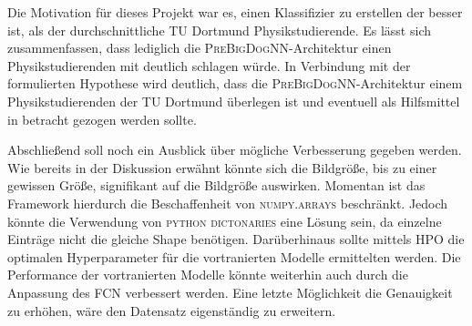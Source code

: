 Die Motivation für dieses Projekt war es, einen Klassifizier zu erstellen
der besser ist, als der durchschnittliche TU Dortmund Physikstudierende.
Es lässt sich zusammenfassen, dass lediglich die \textsc{PreBigDogNN}-Architektur
einen Physikstudierenden mit deutlich schlagen würde. In Verbindung mit
der formulierten Hypothese wird deutlich, dass die \textsc{PreBigDogNN}-Architektur
einem Physikstudierenden der TU Dortmund überlegen ist und eventuell als Hilfsmittel
in betracht gezogen werden sollte.

Abschließend soll noch ein Ausblick über mögliche Verbesserung gegeben werden.
Wie bereits in der Diskussion erwähnt könnte sich die Bildgröße, bis zu einer
gewissen Größe, signifikant auf die Bildgröße auswirken. Momentan ist das
Framework hierdurch die Beschaffenheit von \textsc{numpy.arrays} beschränkt.
Jedoch könnte die Verwendung von \textsc{python} \textsc{dictonaries} eine Lösung sein,
da einzelne Einträge nicht die gleiche Shape benötigen. Darüberhinaus sollte mittels
HPO die optimalen Hyperparameter für die vortranierten Modelle ermittelten werden.
Die Performance der vortranierten Modelle könnte weiterhin auch durch die Anpassung
des FCN verbessert werden. Eine letzte Möglichkeit die Genauigkeit zu erhöhen,
wäre den Datensatz eigenständig zu erweitern.

\newpage
